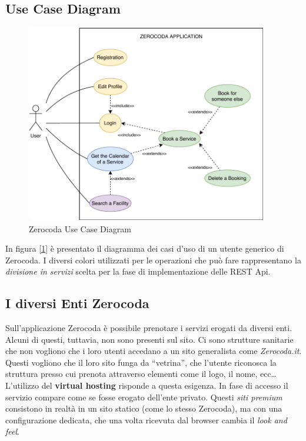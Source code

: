\subsection{Use Case Diagram}
\begin{figure}[H]
    \centering
    \includegraphics[width=0.94\textwidth]{images/02_1_zerocoda_usecase.pdf}
    \caption{Zerocoda Use Case Diagram}
    \label{fig:zerocodausecase}
\end{figure}
In figura [\ref{fig:zerocodausecase}] è presentato il diagramma dei casi d'uso di un utente generico di Zerocoda. I diversi colori utilizzati per le operazioni che può fare rappresentano la \textit{divisione in servizi} scelta per la fase di implementazione delle REST Api.

\subsection{I diversi Enti Zerocoda}
Sull'applicazione Zerocoda è possibile prenotare i servizi erogati da diversi enti. Alcuni di questi, tuttavia, non sono presenti sul sito. Ci sono strutture sanitarie che non vogliono che i loro utenti accedano a un sito generalista come \emph{Zerocoda.it}. Questi vogliono che il loro sito funga da ``vetrina'', che l'utente riconosca la struttura presso cui prenota attraverso elementi come il logo, il nome, ecc\dots L'utilizzo del \textbf{virtual hosting} risponde a questa esigenza. In fase di accesso il servizio compare come se fosse erogato dell’ente privato. Questi \textit{siti premium} consistono in realtà in un sito statico (come lo stesso Zerocoda), ma con una configurazione dedicata, che una volta ricevuta dal browser cambia il \emph{look and feel}.

